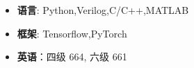   \begin{itemize}[leftmargin=*]
    \item \textbf{语言}: Python,Verilog,C/C++,MATLAB
    \item \textbf{框架}: Tensorflow,PyTorch
    \item \textbf{英语}：四级 664, 六级 661
  \end{itemize}